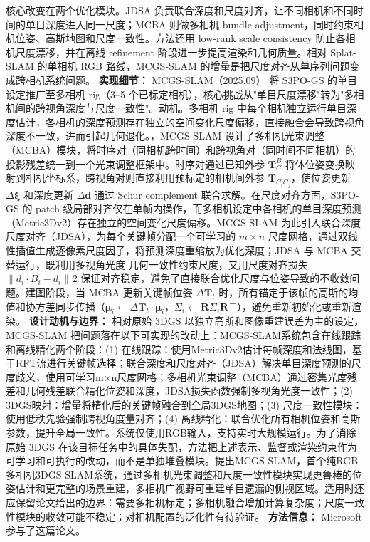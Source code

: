核心改变在两个优化模块。JDSA 负责联合深度和尺度对齐，让不同相机和不同时间的单目深度进入同一尺度；MCBA 则做多相机 bundle adjustment，同时约束相机位姿、高斯地图和尺度一致性。方法还用 low-rank scale consistency 防止各相机尺度漂移，并在离线 refinement 阶段进一步提高渲染和几何质量。相对 Splat-SLAM 的单相机 RGB 路线，MCGS-SLAM 的增量是把尺度对齐从单序列问题变成跨相机系统问题。
\textbf{实现细节：} MCGS-SLAM（2025.09） 将 S3PO-GS 的单目设定推广至多相机 rig（3--5 个已标定相机），核心挑战从"单目尺度漂移"转为"多相机间的跨视角深度与尺度一致性"。动机。多相机 rig 中每个相机独立运行单目深度估计，各相机的深度预测存在独立的空间变化尺度偏移，直接融合会导致跨视角深度不一致，进而引起几何退化。，MCGS-SLAM 设计了多相机光束调整（MCBA）模块，将时序对（同相机跨时间）和跨视角对（同时间不同相机）的投影残差统一到一个光束调整框架中。时序对通过已知外参 $\mathbf{T}_C^B$ 将体位姿变换映射到相机坐标系，跨视角对则直接利用预标定的相机间外参 $\mathbf{T}_{C_i C_j}$，使位姿更新 $\Delta\boldsymbol{\xi}$ 和深度更新 $\Delta\mathbf{d}$ 通过 Schur complement 联合求解。在尺度对齐方面，S3PO-GS 的 patch 级局部对齐仅在单帧内操作，而多相机设定中各相机的单目深度预测（Metric3Dv2）存在独立的空间变化尺度偏移。MCGS-SLAM 为此引入联合深度-尺度对齐（JDSA），为每个关键帧分配一个可学习的 $m \times n$ 尺度网格，通过双线性插值生成逐像素尺度因子，将预测深度重缩放为优化深度；JDSA 与 MCBA 交替运行，既利用多视角光度-几何一致性约束尺度，又用尺度对齐损失 $\|\tilde{d}_i \cdot B_i - d_i\|^{}2$ 保证对齐稳定，避免了直接联合优化尺度与位姿导致的不收敛问题。建图阶段，当 MCBA 更新关键帧位姿 $\Delta\mathbf{T}_t$ 时，所有锚定于该帧的高斯的均值和协方差同步传播（$\boldsymbol{\mu}_i \leftarrow \Delta\mathbf{T}_t \cdot \boldsymbol{\mu}_i$，$\Sigma_i \leftarrow \mathbf{R}\Sigma_i\mathbf{R}^{}\top$），避免重新初始化或重新渲染。
\textbf{设计动机与边界：} 相对原始 3DGS 以独立高斯和图像重建误差为主的设定，MCGS-SLAM 把问题落在以下可实现的改动上：MCGS-SLAM系统包含在线跟踪和离线精化两个阶段：(1) 在线跟踪：使用Metric3Dv2估计每帧深度和法线图，基于RFT流进行关键帧选择；联合深度和尺度对齐（JDSA）解决单目深度预测的尺度歧义，使用可学习m×n尺度网格；多相机光束调整（MCBA）通过密集光度残差和几何残差联合精化位姿和深度，JDSA损失函数强制多视角光度一致性；(2) 3DGS映射：增量将精化后的关键帧融合到全局3DGS地图；(3) 尺度一致性模块：使用低秩先验强制跨视角度量对齐；(4) 离线精化：联合优化所有相机位姿和高斯参数，提升全局一致性。系统仅使用RGB输入，支持实时大规模运行。为了消除原始 3DGS 在该目标任务中的具体失配，方法把上述表示、监督或渲染约束作为可学习和可执行的改动，而不是单独堆叠模块。提出MCGS-SLAM，首个纯RGB多相机3DGS-SLAM系统，通过多相机光束调整和尺度一致性模块实现更鲁棒的位姿估计和更完整的场景重建，多相机广视野可重建单目遗漏的侧视区域。适用时还应保留论文给出的边界：需要多相机标定；多相机融合增加计算复杂度；尺度一致性模块的收敛可能不稳定；对相机配置的泛化性有待验证。
\textbf{方法信息：} Microsoft 参与了这篇论文。




